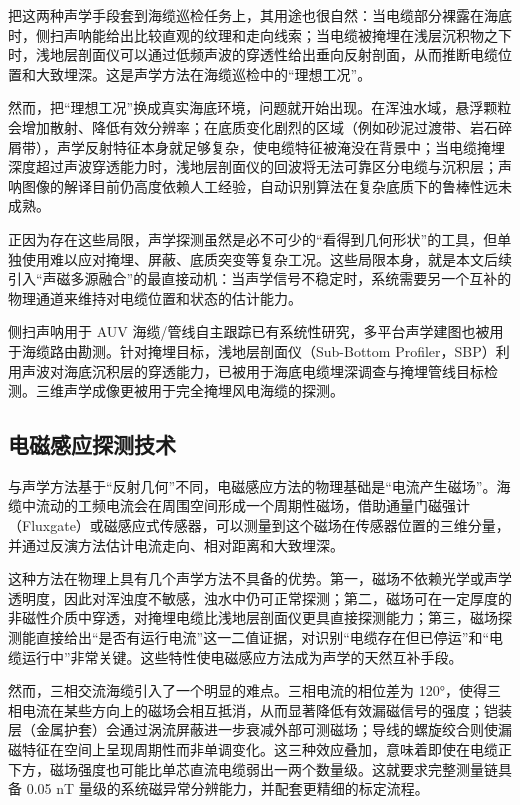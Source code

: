 把这两种声学手段套到海缆巡检任务上，其用途也很自然：当电缆部分裸露在海底时，侧扫声呐能给出比较直观的纹理和走向线索；当电缆被掩埋在浅层沉积物之下时，浅地层剖面仪可以通过低频声波的穿透性给出垂向反射剖面，从而推断电缆位置和大致埋深。这是声学方法在海缆巡检中的``理想工况''。

然而，把``理想工况''换成真实海底环境，问题就开始出现。在浑浊水域，悬浮颗粒会增加散射、降低有效分辨率；在底质变化剧烈的区域（例如砂泥过渡带、岩石碎屑带），声学反射特征本身就足够复杂，使电缆特征被淹没在背景中；当电缆掩埋深度超过声波穿透能力时，浅地层剖面仪的回波将无法可靠区分电缆与沉积层；声呐图像的解译目前仍高度依赖人工经验，自动识别算法在复杂底质下的鲁棒性远未成熟。

正因为存在这些局限，声学探测虽然是必不可少的``看得到几何形状''的工具，但单独使用难以应对掩埋、屏蔽、底质突变等复杂工况。这些局限本身，就是本文后续引入``声磁多源融合''的最直接动机：当声学信号不稳定时，系统需要另一个互补的物理通道来维持对电缆位置和状态的估计能力。

侧扫声呐用于 AUV 海缆/管线自主跟踪已有系统性研究\cite{bagnitsky2011sidescan,feng2023automatic}，多平台声学建图也被用于海缆路由勘测\cite{jung2022multimodal}。针对掩埋目标，浅地层剖面仪（Sub-Bottom Profiler，SBP）利用声波对海底沉积层的穿透能力，已被用于海底电缆埋深调查与掩埋管线目标检测\cite{wunderlich2016burial,zheng2021zeroshot}。三维声学成像更被用于完全掩埋风电海缆的探测\cite{ha2022buried}。

\subsection{电磁感应探测技术}\label{sec:ch01-1-2-2}

与声学方法基于``反射几何''不同，电磁感应方法的物理基础是``电流产生磁场''。海缆中流动的工频电流会在周围空间形成一个周期性磁场，借助通量门磁强计（Fluxgate）或磁感应式传感器，可以测量到这个磁场在传感器位置的三维分量，并通过反演方法估计电流走向、相对距离和大致埋深。

这种方法在物理上具有几个声学方法不具备的优势。第一，磁场不依赖光学或声学透明度，因此对浑浊度不敏感，浊水中仍可正常探测；第二，磁场可在一定厚度的非磁性介质中穿透，对掩埋电缆比浅地层剖面仪更具直接探测能力；第三，磁场探测能直接给出``是否有运行电流''这一二值证据，对识别``电缆存在但已停运''和``电缆运行中''非常关键。这些特性使电磁感应方法成为声学的天然互补手段。

然而，三相交流海缆引入了一个明显的难点。三相电流的相位差为 120°，使得三相电流在某些方向上的磁场会相互抵消，从而显著降低有效漏磁信号的强度；铠装层（金属护套）会通过涡流屏蔽进一步衰减外部可测磁场；导线的螺旋绞合则使漏磁特征在空间上呈现周期性而非单调变化。这三种效应叠加，意味着即使在电缆正下方，磁场强度也可能比单芯直流电缆弱出一两个数量级。这就要求完整测量链具备 0.05 nT 量级的系统磁异常分辨能力，并配套更精细的标定流程。

